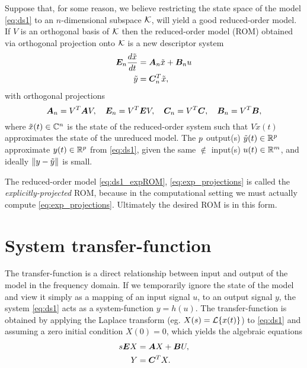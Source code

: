 Suppose that, for some reason, we believe restricting the state space of the model \eqref{eq:ds1} to an $n$-dimensional subspace  $\mathcal{K}$, will yield a good reduced-order model.  If $V$ is an orthogonal basis of $\mathcal{K}$ then the  reduced-order model (ROM) obtained via orthogonal projection onto $\mathcal{K}$ is a new descriptor system
         \begin{equation}
         \begin{aligned}
                \bm{E}_n\frac{d\tilde{x}}{dt} &= \bm{A}_n \tilde{x} + \bm{B}_n u\\
                \tilde{y} &= \bm{C}_n^T \tilde{x},
        \end{aligned}
        \label{eq:ds1_expROM}
        \end{equation}
with orthogonal projections
\begin{equation}
	\bm{A}_n = V^T \bm{A} V, \quad \bm{E}_n = V^T \bm{E} V, \quad \bm{C}_n = V^T \bm{C}, \quad \bm{B}_n = V^T \bm{B},
       \label{eq:exp_projections}
\end{equation}
where $\tilde{x}(t)\in\mathbb{C}^n$ is the state of the reduced-order system such that $V\tilde{x}(t)$ approximates the state of the unreduced model.  The $p$ output(s) $\tilde{y}(t)\in\mathbb{R}^p$ approximate $y(t)\in\mathbb{R}^p$ from \eqref{eq:ds1}, given the same $\nin$ input(s) $u(t)\in\mathbb{R}^m$, and ideally $\left\| y-\tilde{y} \right\|_{}$ is small.   
\bigskip

The reduced-order model \eqref{eq:ds1_expROM}, \eqref{eq:exp_projections} is called the  \emph{explicitly-projected} ROM, because in the computational setting we must actually compute \eqref{eq:exp_projections}.   Ultimately the desired ROM is in this form.
  
        \section{System transfer-function}\label{sec:tfunc_formulations}
       The  transfer-function  is a direct 
        relationship between input and output of the model in the frequency domain.  If we temporarily ignore the state of the model and view it simply as a mapping of an input signal $u$, to an output signal $y$, the system \eqref{eq:ds1} acts as a system-function $y=h(u)$.  The transfer-function is obtained by applying the Laplace transform (eg. $X(s)=\mathcal{L}\{x(t)\}$) to  
        \eqref{eq:ds1} and assuming a zero initial condition $X(0)=0$, which 
        yields the algebraic equations 
         \begin{equation*}
                         \begin{aligned}
                                s\bm{E} X &=  \bm{A} X + \bm{B} U,\\
                                Y &= \bm{C}^TX.
                        \end{aligned}
        \end{equation*}

